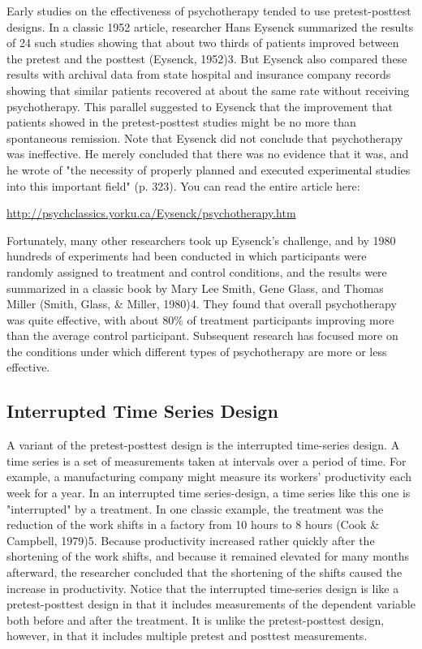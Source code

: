 \color{fgcolor}\begin{kframe}

Early studies on the effectiveness of psychotherapy tended to use pretest-posttest designs. In a classic 1952 article, researcher Hans Eysenck summarized the results of 24 such studies showing that about two thirds of patients improved between the pretest and the posttest (Eysenck, 1952)3. But Eysenck also compared these results with archival data from state hospital and insurance company records showing that similar patients recovered at about the same rate without receiving psychotherapy. This parallel suggested to Eysenck that the improvement that patients showed in the pretest-posttest studies might be no more than spontaneous remission. Note that Eysenck did not conclude that psychotherapy was ineffective. He merely concluded that there was no evidence that it was, and he wrote of "the necessity of properly planned and executed experimental studies into this important field" (p. 323). You can read the entire article here:

\url{http://psychclassics.yorku.ca/Eysenck/psychotherapy.htm}

Fortunately, many other researchers took up Eysenck's challenge, and by 1980 hundreds of experiments had been conducted in which participants were randomly assigned to treatment and control conditions, and the results were summarized in a classic book by Mary Lee Smith, Gene Glass, and Thomas Miller (Smith, Glass, \& Miller, 1980)4. They found that overall psychotherapy was quite effective, with about 80\% of treatment participants improving more than the average control participant. Subsequent research has focused more on the conditions under which different types of psychotherapy are more or less effective.
\end{kframe}

\subsection{Interrupted Time Series Design}


A variant of the pretest-posttest design is the interrupted time-series design. A time series is a set of measurements taken at intervals over a period of time. For example, a manufacturing company might measure its workers' productivity each week for a year. In an interrupted time series-design, a time series like this one is "interrupted" by a treatment. In one classic example, the treatment was the reduction of the work shifts in a factory from 10 hours to 8 hours (Cook \& Campbell, 1979)5. Because productivity increased rather quickly after the shortening of the work shifts, and because it remained elevated for many months afterward, the researcher concluded that the shortening of the shifts caused the increase in productivity. Notice that the interrupted time-series design is like a pretest-posttest design in that it includes measurements of the dependent variable both before and after the treatment. It is unlike the pretest-posttest design, however, in that it includes multiple pretest and posttest measurements.


